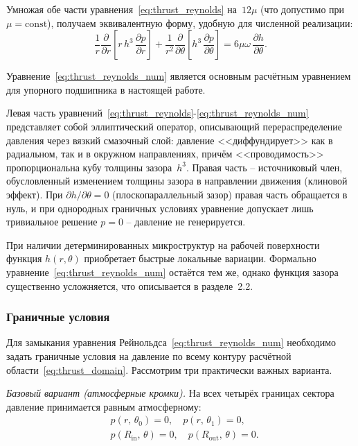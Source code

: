 Умножая обе части уравнения~\eqref{eq:thrust_reynolds} на~$12\mu$ (что допустимо при $\mu = \mathrm{const}$), получаем эквивалентную форму, удобную для численной реализации:
\begin{equation}
\frac{1}{r}\frac{\partial}{\partial r}\!\left[r\,h^3\,\frac{\partial p}{\partial r}\right] + \frac{1}{r^2}\frac{\partial}{\partial \theta}\!\left[h^3\,\frac{\partial p}{\partial \theta}\right] = 6\mu\omega\,\frac{\partial h}{\partial \theta}.
\label{eq:thrust_reynolds_num}
\end{equation}

Уравнение~\eqref{eq:thrust_reynolds_num} является основным расчётным уравнением для упорного подшипника в настоящей работе.

Левая часть уравнений~\eqref{eq:thrust_reynolds}-\eqref{eq:thrust_reynolds_num} представляет собой эллиптический оператор, описывающий перераспределение давления через вязкий смазочный слой: давление <<диффундирует>> как в радиальном, так и в окружном направлениях, причём <<проводимость>> пропорциональна кубу толщины зазора~$h^3$. Правая часть -- источниковый член, обусловленный изменением толщины зазора в направлении движения (клиновой эффект). При $\partial h/\partial \theta = 0$ (плоскопараллельный зазор) правая часть обращается в нуль, и при однородных граничных условиях уравнение допускает лишь тривиальное решение $p = 0$ -- давление не генерируется.

При наличии детерминированных микроструктур на рабочей поверхности функция $h(r,\theta)$ приобретает быстрые локальные вариации. Формально уравнение~\eqref{eq:thrust_reynolds_num} остаётся тем же, однако функция зазора существенно усложняется, что описывается в разделе~2.2.


\subsubsection*{Граничные условия}

Для замыкания уравнения Рейнольдса~\eqref{eq:thrust_reynolds_num} необходимо задать граничные условия на давление по всему контуру расчётной области~\eqref{eq:thrust_domain}. Рассмотрим три практически важных варианта.

\textit{Базовый вариант (атмосферные кромки).} На всех четырёх границах сектора давление принимается равным атмосферному:
\begin{equation}
\begin{aligned}
&p(r,\,\theta_0) = 0, \quad p(r,\,\theta_1) = 0, \\
&p(R_{\mathrm{in}},\,\theta) = 0, \quad p(R_{\mathrm{out}},\,\theta) = 0.
\end{aligned}
\label{eq:thrust_bc_base}
\end{equation}

